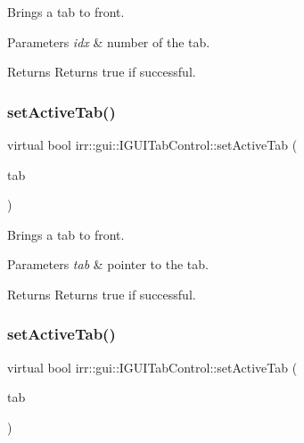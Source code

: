 Brings a tab to front. 


\begin{DoxyParams}{Parameters}
{\em idx} & number of the tab. \\
\hline
\end{DoxyParams}
\begin{DoxyReturn}{Returns}
Returns true if successful. 
\end{DoxyReturn}
\mbox{\label{classirr_1_1gui_1_1IGUITabControl_acea5fca2d2a883a450d4df823eea27d5}} 
\subsubsection{\texorpdfstring{set\+Active\+Tab()}{setActiveTab()}\hspace{0.1cm}{\footnotesize\ttfamily [3/4]}}
{\footnotesize\ttfamily virtual bool irr\+::gui\+::\+I\+G\+U\+I\+Tab\+Control\+::set\+Active\+Tab (\begin{DoxyParamCaption}\item[{\hyperlink{classirr_1_1gui_1_1IGUITab}{I\+G\+U\+I\+Tab} $\ast$}]{tab }\end{DoxyParamCaption})\hspace{0.3cm}{\ttfamily [pure virtual]}}



Brings a tab to front. 


\begin{DoxyParams}{Parameters}
{\em tab} & pointer to the tab. \\
\hline
\end{DoxyParams}
\begin{DoxyReturn}{Returns}
Returns true if successful. 
\end{DoxyReturn}
\mbox{\label{classirr_1_1gui_1_1IGUITabControl_acea5fca2d2a883a450d4df823eea27d5}} 
\subsubsection{\texorpdfstring{set\+Active\+Tab()}{setActiveTab()}\hspace{0.1cm}{\footnotesize\ttfamily [4/4]}}
{\footnotesize\ttfamily virtual bool irr\+::gui\+::\+I\+G\+U\+I\+Tab\+Control\+::set\+Active\+Tab (\begin{DoxyParamCaption}\item[{\hyperlink{classirr_1_1gui_1_1IGUITab}{I\+G\+U\+I\+Tab} $\ast$}]{tab }\end{DoxyParamCaption})\hspace{0.3cm}{\ttfamily [pure virtual]}}



